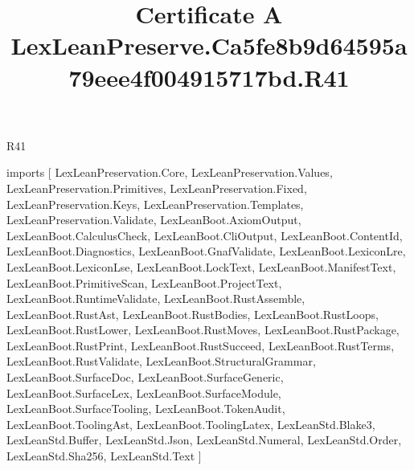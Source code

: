 \begin{lexlean}{R41}
\title{Certificate A LexLeanPreserve.Ca5fe8b9d64595a79eee4f004915717bd.R41}
\begin{coremodule}
imports [
  LexLeanPreservation.Core,
  LexLeanPreservation.Values,
  LexLeanPreservation.Primitives,
  LexLeanPreservation.Fixed,
  LexLeanPreservation.Keys,
  LexLeanPreservation.Templates,
  LexLeanPreservation.Validate,
  LexLeanBoot.AxiomOutput,
  LexLeanBoot.CalculusCheck,
  LexLeanBoot.CliOutput,
  LexLeanBoot.ContentId,
  LexLeanBoot.Diagnostics,
  LexLeanBoot.GnafValidate,
  LexLeanBoot.LexiconLre,
  LexLeanBoot.LexiconLse,
  LexLeanBoot.LockText,
  LexLeanBoot.ManifestText,
  LexLeanBoot.PrimitiveScan,
  LexLeanBoot.ProjectText,
  LexLeanBoot.RuntimeValidate,
  LexLeanBoot.RustAssemble,
  LexLeanBoot.RustAst,
  LexLeanBoot.RustBodies,
  LexLeanBoot.RustLoops,
  LexLeanBoot.RustLower,
  LexLeanBoot.RustMoves,
  LexLeanBoot.RustPackage,
  LexLeanBoot.RustPrint,
  LexLeanBoot.RustSucceed,
  LexLeanBoot.RustTerms,
  LexLeanBoot.RustValidate,
  LexLeanBoot.StructuralGrammar,
  LexLeanBoot.SurfaceDoc,
  LexLeanBoot.SurfaceGeneric,
  LexLeanBoot.SurfaceLex,
  LexLeanBoot.SurfaceModule,
  LexLeanBoot.SurfaceTooling,
  LexLeanBoot.TokenAudit,
  LexLeanBoot.ToolingAst,
  LexLeanBoot.ToolingLatex,
  LexLeanStd.Blake3,
  LexLeanStd.Buffer,
  LexLeanStd.Json,
  LexLeanStd.Numeral,
  LexLeanStd.Order,
  LexLeanStd.Sha256,
  LexLeanStd.Text
]


\end{coremodule}
\end{lexlean}
